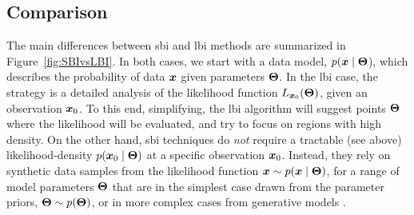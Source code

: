 \subsection{Comparison}
The main differences between \gls*{sbi} and \gls*{lbi} methods are summarized in Figure~\ref{fig:SBIvsLBI}. In both cases, we start with a data model, $p(\bm{x}\mid\bm{\Theta}$), which describes the probability of data $\bm{x}$ given parameters $\bm{\Theta}$. In the \gls*{lbi} case, the strategy is a detailed analysis of the likelihood function $L_{\bm{x}_0}(\bm{\Theta})$, given an observation $\bm{x}_0$. To this end, simplifying, the \gls*{lbi} algorithm will suggest points $\bm{\Theta}$ where the likelihood will be evaluated, and try to focus on regions with high density. On the other hand, \gls*{sbi} techniques do \emph{not} require a tractable (see above) likelihood-density $p(\bm{x}_0\mid\bm{\Theta})$ at a specific observation $\bm{x}_0$. Instead, they rely on synthetic data samples from the likelihood function $\bm{x} \sim p(\bm{x}\mid\bm{\Theta})$, for a range of model parameters $\bm{\Theta}$ that are in the simplest case drawn from the parameter priors, $\bm{\Theta} \sim p(\bm{\Theta})$, or in more complex cases from generative models \cite[\eg][]{Karchev:2022aa}. %



